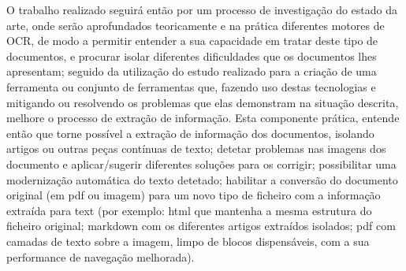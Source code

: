 O trabalho realizado seguirá então por um processo de investigação do estado da arte, onde serão aprofundados teoricamente e na prática diferentes motores de OCR, de modo a permitir entender a sua capacidade em tratar deste tipo de documentos, e procurar isolar diferentes dificuldades que os documentos lhes apresentam; seguido da utilização do estudo realizado para a criação de uma ferramenta ou conjunto de ferramentas que, fazendo uso destas tecnologias e mitigando ou resolvendo os problemas que elas demonstram na situação descrita, melhore o processo de extração de informação. Esta componente prática, entende então que torne possível a extração de informação dos documentos, isolando artigos ou outras peças contínuas de texto; detetar problemas nas imagens dos documento e aplicar/sugerir diferentes soluções para os corrigir; possibilitar uma modernização automática do texto detetado; habilitar a conversão do documento original (em pdf ou imagem) para um novo tipo de ficheiro com a informação extraída para text (por exemplo: html que mantenha a mesma estrutura do ficheiro original; markdown com os diferentes artigos extraídos isolados; pdf com camadas de texto sobre a imagem, limpo de blocos dispensáveis, com a sua performance de navegação melhorada).